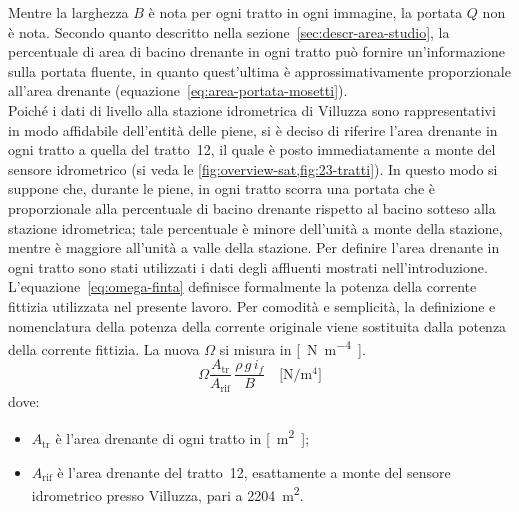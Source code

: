 Mentre la larghezza $B$ è nota per ogni tratto in ogni immagine, la portata $Q$ non è nota.
Secondo quanto descritto nella sezione~\ref{sec:descr-area-studio}, la percentuale di area di bacino drenante in ogni tratto può fornire un'informazione sulla portata fluente, in quanto quest'ultima è approssimativamente proporzionale all'area drenante (equazione~\eqref{eq:area-portata-mosetti}).
\\
Poiché i dati di livello alla stazione idrometrica di Villuzza sono rappresentativi in modo affidabile dell'entità delle piene, si è deciso di riferire l'area drenante in ogni tratto a quella del tratto~12, il quale è posto immediatamente a monte del sensore idrometrico (si veda le \cref{fig:overview-sat,fig:23-tratti}).
In questo modo si suppone che, durante le piene, in ogni tratto scorra una portata che è proporzionale alla percentuale di bacino drenante rispetto al bacino sotteso alla stazione idrometrica; tale percentuale è minore dell'unità a monte della stazione, mentre è maggiore all'unità a valle della stazione.
Per definire l'area drenante in ogni tratto sono stati utilizzati i dati degli affluenti mostrati nell'introduzione.
\\
L'equazione~\eqref{eq:omega-finta} definisce formalmente la potenza della corrente fittizia utilizzata nel presente lavoro.
Per comodità e semplicità, la definizione e nomenclatura della potenza della corrente originale viene sostituita dalla potenza della corrente fittizia.
La nuova $\Omega$ si misura in \si{[\newton\per\m\tothe{4}]}.
%
\begin{equation}
	\label{eq:omega-finta}
	\Omega
	\frac{A_\mathrm{tr}}{A_\mathrm{rif}} \, \frac{\rho \, g \, i_f}{B}
	\quad
	\si{[\newton\per\m\tothe{4}]}
\end{equation}
%
dove:
%
\begin{itemize}
	\item $A_\mathrm{tr}$ è l'area drenante di ogni tratto in \si{[\m\tothe{2}]};
	\item $A_\mathrm{rif}$ è l'area drenante del tratto~12, esattamente a monte del sensore idrometrico presso Villuzza, pari a \SI{2204}{\m\tothe{2}}.
\end{itemize}
%
